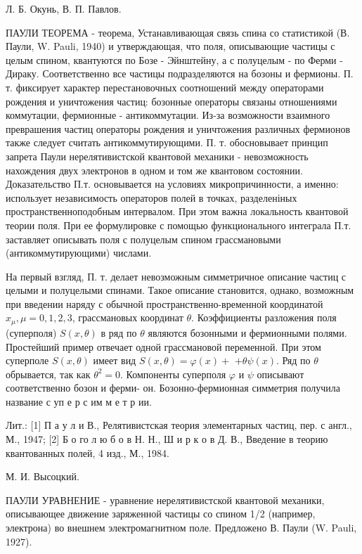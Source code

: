 \documentclass[10pt]{article}
\begin{document}
Л. Б. Окунь, В. П. Павлов.



ПАУЛИ ТЕОРЕМА - теорема, Устанавливающая связь спина со статистикой (В. Паули, W. Pauli, 1940) и утверждающая, что поля, описывающие частицы с целым спином, квантуются по Бозе - Эйнштейну, а с полуцелым - по Ферми - Дираку. Соответственно все частицы подразделяются на бозоны и фермионы. П. т. фиксирует характер перестановочных соотношений между операторами рождения и уничтожения частиц: бозонные операторы связаны отношениями коммутации, фермионные - антикоммутации. Из-за возможности взаимного преврашения частиц операторы рождения и уничтожения различных фермионов также следует считать антикоммутирующими. П. т. обосновывает принцип запрета Паули нерелятивистской квантовой механики - невозможность нахождения двух электронов в одном и том же квантовом состоянии. Доказательство П.т. основывается на условиях микропричинности, а именно: использует независимость операторов полей в точках, разделеніных пространственноподобным интервалом. При этом важна локальность квантовой теории поля. При ее формулировке с помощью функционального интеграла П.т. заставляет описывать поля с полуцелым спином грассмановыми (антикоммутирующими) числами.



На первый взгляд, П. т. делает невозможным симметричное описание частиц с целыми и полуцелыми спинами. Такое описание становится, однако, возможным при введении наряду с обычной пространственно-временной координатой $x_{\mu}, \mu=0,1,2,3$, грассмановых координат $\theta$. Коэффициенты разложения поля (суперполя) $S(x, \theta)$ в ряд по $\theta$ являются бозонными и фермионными полями. Простейший пример отвечает одной грассмановой переменной. При этом суперполе $S(x, \theta)$ имеет вид $S(x, \theta)=\varphi(x)+$ $+\theta \psi(x)$. Ряд по $\theta$ обрывается, так как $\theta^{2}=0$. Компоненты суперполя $\varphi$ и $\psi$ описывают соответственно бозон и ферми- он. Бозонно-фермионная симметрия получила название с уп е р с им м е т р ии.



Лит.: [1] П а у л и В., Релятивистская теория элементарных частиц, пер. с англ., М., 1947; [2] Б о го л ю б о в Н. Н., Ш и р к о в Д. В., Введение в теорию квантованных полей, 4 изд., М., 1984.



М. И. Высоцкий.



ПАУЛИ УРАВНЕНИЕ - уравнение нерелятивистской квантовой механики, описывающее движение заряженной частицы со спином 1/2 (например, электрона) во внешнем электромагнитном поле. Предложено В. Паули (W. Pauli, 1927).
\end{document}
